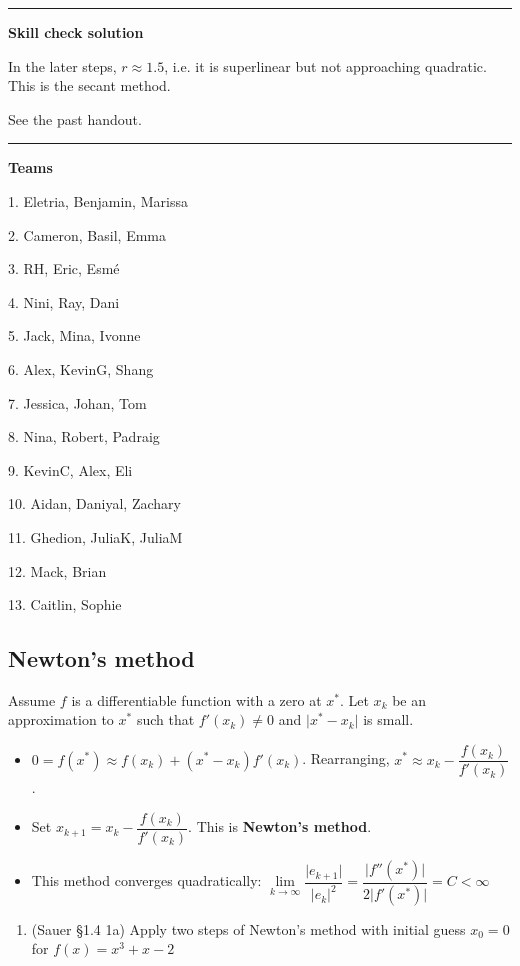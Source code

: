 \documentclass[12pt,letterpaper,noanswers]{exam}
\begin{document}
\vspace{0.2cm}
\hrule
\vspace{0.2cm}

\noindent \textbf{Skill check solution}
\begin{questions}
\item In the later steps, $r\approx 1.5$, i.e. it is superlinear but not approaching quadratic.  This is the secant method.

\item See the past handout.
\end{questions}
\vspace{0.2cm}
\hrule
\vspace{0.2cm}

\noindent \textbf{Teams}
\begin{multicols}{3}
1. Eletria, Benjamin, Marissa

2. Cameron, Basil, Emma

3. RH, Eric, Esmé

4. Nini, Ray, Dani

5. Jack, Mina, Ivonne

6. Alex, KevinG, Shang

7. Jessica, Johan, Tom

8. Nina, Robert, Padraig

9. KevinC, Alex, Eli

10.  Aidan, Daniyal, Zachary

11. Ghedion, JuliaK, JuliaM

12. Mack, Brian

13. Caitlin, Sophie

\end{multicols}

\subsection*{Newton's method}
\begin{tcolorbox}
Assume $f$ is a differentiable function with a zero at $x^*$.  Let $x_k$ be an approximation to $x^*$ such that $f'(x_k)\neq 0$ and $\vert x^*-x_k\vert$ is small.
\begin{itemize}
\itemsep0pt
    \item $ 0 = f(x^*) \approx f(x_k) + (x^*-x_k)f'(x_k)$.  Rearranging, $x^* \approx x_k - \dfrac{f(x_k)}{f'(x_k)}$.
    \item Set $x_{k+1} = x_k - \dfrac{f(x_k)}{f'(x_k)}$.  This is \textbf{Newton's method}.
    \item This method converges quadratically: $\lim\limits_{k\rightarrow\infty} \dfrac{\vert e_{k+1}\vert }{\vert e_k\vert^2 } = \dfrac{\vert f''(x^*)\vert}{2\vert f'(x^*)\vert} = C < \infty$
\end{itemize}
\end{tcolorbox}
\begin{enumerate}[resume=classQ]
    \item (Sauer \S1.4 1a) Apply two steps of Newton's method with initial guess $x_0 = 0$ for $f(x) = x^3+x-2$
    \vspace{1in}
    
  
\end{enumerate}
\end{document}
